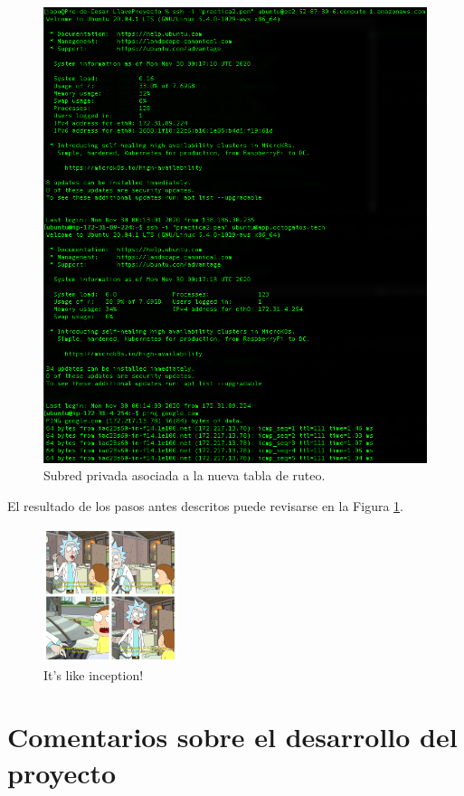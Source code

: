 \documentclass{article}
\begin{document}
\begin{figure}[H]
  \centering
  \includegraphics[width=\textwidth]{NAT/result}
  \caption{Subred privada asociada a la nueva tabla
  de ruteo.}
  \label{fig:NAT-result}
\end{figure}

El resultado de los pasos antes descritos puede
revisarse en la Figura \ref{fig:NAT-result}.
\begin{figure}[H]
  \centering
  \includegraphics[width=0.35\textwidth]{NAT/inception}
  \caption{It's like inception!}
\end{figure}

\section{Comentarios sobre el desarrollo del proyecto}
\end{document}
